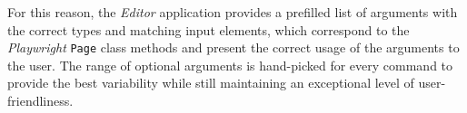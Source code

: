 For this reason, the \textit{Editor} application provides a prefilled list of arguments with the correct types and matching input elements,
which correspond to the \textit{Playwright} \texttt{Page} class methods and present the correct usage of the arguments to the user.
The range of optional arguments is hand-picked for every command to provide the best variability while still maintaining an exceptional level of user-friendliness.
